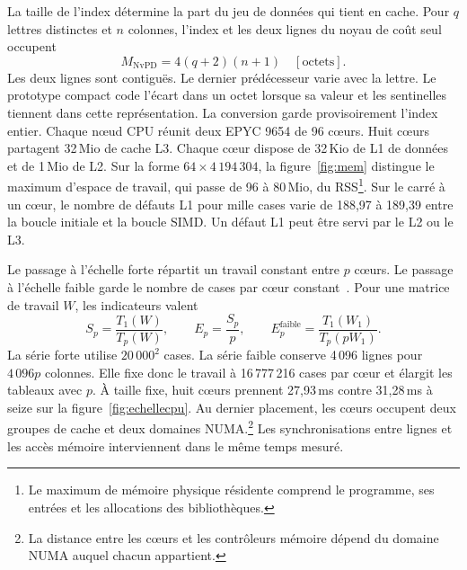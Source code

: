 La taille de l'index détermine la part du jeu de données qui tient en cache. Pour \(q\) lettres distinctes et \(n\) colonnes, l'index et les deux lignes du noyau de coût seul occupent
\[
 M_{\mathrm{NvPD}}=4(q+2)(n+1)\quad [\text{octets}].
\]
Les deux lignes sont contiguës. Le dernier prédécesseur varie avec la lettre. Le prototype compact code l'écart dans un octet lorsque sa valeur et les sentinelles tiennent dans cette représentation. La conversion garde provisoirement l'index entier. Chaque nœud CPU réunit deux EPYC 9654 de 96 cœurs. Huit cœurs partagent 32\,Mio de cache L3. Chaque cœur dispose de 32\,Kio de L1 de données et de 1\,Mio de L2.
Sur la forme \(64\times4\,194\,304\), la figure~\ref{fig:mem} distingue le maximum d'espace de travail, qui passe de 96 à 80\,Mio, du RSS\footnote{Le maximum de mémoire physique résidente comprend le programme, ses entrées et les allocations des bibliothèques.}. Sur le carré à un cœur, le nombre de défauts L1 pour mille cases varie de 188,97 à 189,39 entre la boucle initiale et la boucle SIMD. Un défaut L1 peut être servi par le L2 ou le L3.

Le passage à l'échelle forte répartit un travail constant entre \(p\) cœurs. Le passage à l'échelle faible garde le nombre de cases par cœur constant~\cite{amdahl,gustafson}. Pour une matrice de travail \(W\), les indicateurs valent
\[
 S_p=\frac{T_1(W)}{T_p(W)},\qquad E_p=\frac{S_p}{p},\qquad
 E_p^{\mathrm{faible}}=\frac{T_1(W_1)}{T_p(pW_1)}.
\]
La série forte utilise \(20\,000^2\) cases. La série faible conserve 4\,096 lignes pour \(4\,096p\) colonnes. Elle fixe donc le travail à 16\,777\,216 cases par cœur et élargit les tableaux avec \(p\).
À taille fixe, huit cœurs prennent 27,93\,ms contre 31,28\,ms à seize sur la figure~\ref{fig:echellecpu}. Au dernier placement, les cœurs occupent deux groupes de cache et deux domaines NUMA.\footnote{La distance entre les cœurs et les contrôleurs mémoire dépend du domaine NUMA auquel chacun appartient.} Les synchronisations entre lignes et les accès mémoire interviennent dans le même temps mesuré.
